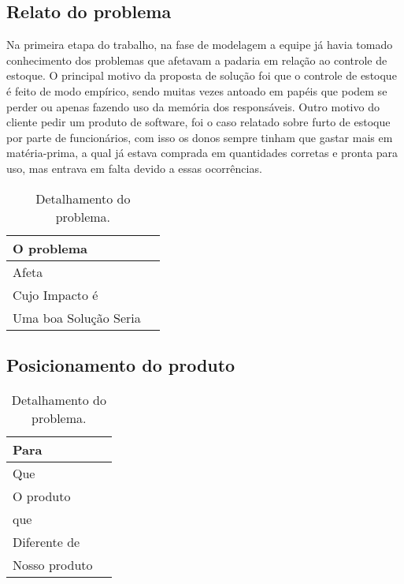 \begin{appendices}
\subsection{Relato do problema}
	Na primeira etapa do trabalho, na fase de modelagem a equipe já havia tomado conhecimento dos problemas que afetavam a padaria em relação ao controle de estoque.
	O principal motivo da proposta de solução foi que o controle de estoque é feito de modo empírico, sendo muitas vezes antoado em papéis que podem se perder ou apenas fazendo uso da memória dos responsáveis. Outro motivo do cliente pedir um produto de software, foi o caso relatado sobre furto de estoque por parte de funcionários, com isso os donos sempre tinham que gastar mais em matéria-prima, a qual já estava comprada em quantidades corretas e pronta para uso, mas entrava em falta devido a essas ocorrências.

	\begin{table}[htb]
	\centering
    \begin{tabular}{|l|l|}
        \hline
        O problema          & {\parbox{12cm}{}}                                        \\ \hline
        Afeta          & {\parbox{12cm}{}}                                                \\ \hline
        Cujo Impacto é            & {\parbox{12cm}{}}                                                                \\ 
        Uma boa Solução Seria             & {\parbox{12cm}{}}                         \\ \hline
    \end{tabular}
    \caption{Detalhamento do problema.}
    \end{table}


\subsection{Posicionamento do produto}

	\begin{table}[htb]
	\centering
    \begin{tabular}{|l|l|}
        \hline
        Para          & {\parbox{12cm}{}}                                        \\ \hline
        Que          & {\parbox{12cm}{}}                                                \\ \hline
        O produto            & {\parbox{12cm}{}}                                                                \\ 
        que             & {\parbox{12cm}{}}                         \\ \hline
        Diferente de             & {\parbox{12cm}{}}                         \\ \hline
        Nosso produto             & {\parbox{12cm}{}}                         \\ \hline
    \end{tabular}
    \caption{Detalhamento do problema.}
    \end{table}


\end{appendices}
